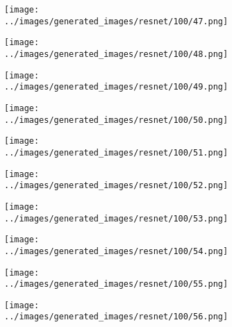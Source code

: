 \begin{figure}[H]
\begin{subfigure}[b]{0.1\textwidth}
\centering
\texttt{[image: ../images/generated\_images/resnet/100/47.png]}
\end{subfigure}
\hspace{1em}%
\begin{subfigure}[b]{0.1\textwidth}
\centering
\texttt{[image: ../images/generated\_images/resnet/100/48.png]}
\end{subfigure}
\hspace{1em}%
\begin{subfigure}[b]{0.1\textwidth}
\centering
\texttt{[image: ../images/generated\_images/resnet/100/49.png]}
\end{subfigure}
\hspace{1em}%
\begin{subfigure}[b]{0.1\textwidth}
\centering
\texttt{[image: ../images/generated\_images/resnet/100/50.png]}
\end{subfigure}
\hspace{1em}%
\begin{subfigure}[b]{0.1\textwidth}
\centering
\texttt{[image: ../images/generated\_images/resnet/100/51.png]}
\end{subfigure}
\hspace{1em}%
\begin{subfigure}[b]{0.1\textwidth}
\centering
\texttt{[image: ../images/generated\_images/resnet/100/52.png]}
\end{subfigure}
\hspace{1em}%
\begin{subfigure}[b]{0.1\textwidth}
\centering
\texttt{[image: ../images/generated\_images/resnet/100/53.png]}
\end{subfigure}
\hspace{1em}%
\begin{subfigure}[b]{0.1\textwidth}
\centering
\texttt{[image: ../images/generated\_images/resnet/100/54.png]}
\end{subfigure}
\hspace{1em}%
\begin{subfigure}[b]{0.1\textwidth}
\centering
\texttt{[image: ../images/generated\_images/resnet/100/55.png]}
\end{subfigure}
\hspace{1em}%
\begin{subfigure}[b]{0.1\textwidth}
\centering
\texttt{[image: ../images/generated\_images/resnet/100/56.png]}

\end{subfigure}
\end{figure}
